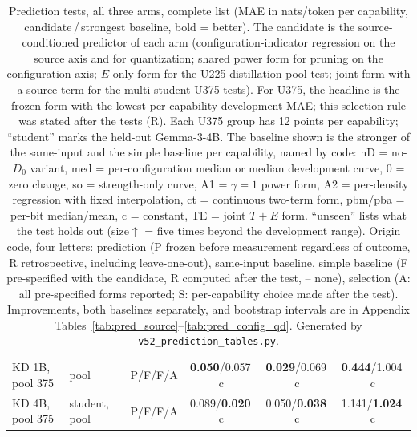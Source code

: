\begin{table}[H]
\begin{tabular}{@{}>{\raggedright\arraybackslash}p{4.15cm}>{\raggedright\arraybackslash}p{1.4cm}lccc@{}}
KD 1B, pool 375 & pool & P/F/F/A & \textbf{0.050}/0.057{\scriptsize\,c} & \textbf{0.029}/0.069{\scriptsize\,c} & \textbf{0.444}/1.004{\scriptsize\,c} \\
KD 4B, pool 375 & student, pool & P/F/F/A & 0.089/\textbf{0.020}{\scriptsize\,c} & 0.050/\textbf{0.038}{\scriptsize\,c} & 1.141/\textbf{1.024}{\scriptsize\,c} \\
\bottomrule\end{tabular}
\caption{\scriptsize Prediction tests, all three arms, complete list (MAE in nats/token per capability, candidate\,/\,strongest baseline, bold = better). The candidate is the source-conditioned predictor of each arm (configuration-indicator regression on the source axis and for quantization; shared power form for pruning on the configuration axis; $E$-only form for the U225 distillation pool test; joint form with a source term for the multi-student U375 tests). For U375, the headline is the frozen form with the lowest per-capability development MAE; this selection rule was stated after the tests (R). Each U375 group has 12 points per capability; ``student'' marks the held-out Gemma-3-4B. The baseline shown is the stronger of the same-input and the simple baseline per capability, named by code: nD = no-$D_0$ variant, med = per-configuration median or median development curve, 0 = zero change, so = strength-only curve, A1 = $\gamma{=}1$ power form, A2 = per-density regression with fixed interpolation, ct = continuous two-term form, pbm/pba = per-bit median/mean, c = constant, TE = joint $T{+}E$ form. ``unseen'' lists what the test holds out (size$\uparrow$ = five times beyond the development range). Origin code, four letters: prediction (P frozen before measurement regardless of outcome, R retrospective, including leave-one-out), same-input baseline, simple baseline (F pre-specified with the candidate, R computed after the test, -- none), selection (A: all pre-specified forms reported; S: per-capability choice made after the test). Improvements, both baselines separately, and bootstrap intervals are in Appendix Tables~\ref{tab:pred_source}--\ref{tab:pred_config_qd}. Generated by \texttt{v52\_prediction\_tables.py}.}
\label{tab:pred_full}\end{table}
